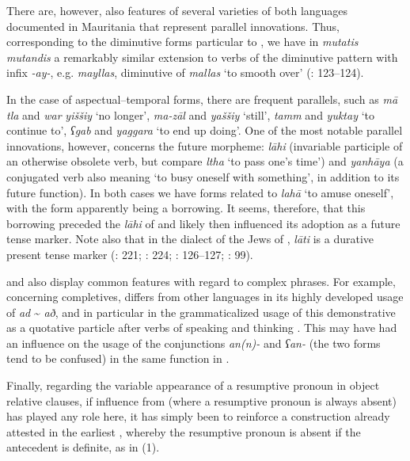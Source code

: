 \documentclass[output=paper]{langsci/langscibook}
\begin{document}
There are, however, also features of several varieties of both languages documented in Mauritania that represent parallel innovations. Thus, corresponding to the {diminutive} forms particular to , we have in  \textit{mutatis} \textit{mutandis} a remarkably similar {extension} to verbs of the {diminutive} pattern with infix \textit{-ay-}, e.g. \textit{mayllas}, {diminutive} of \textit{mallas} ‘to smooth over’ (\citealt{Taine-Cheikh2008chapter}: 123–124).

In the case of aspectual--temporal forms, there are frequent parallels, such as  \textit{mā} \textit{tla} and  \textit{war} \textit{yiššiy} ‘no longer’,  \textit{ma-zāl} and  \textit{yaššiy} ‘still’,  \textit{tamm} and  \textit{yuktay} ‘to continue to’,  \textit{ʕgab} and  \textit{yaggara} ‘to end up doing’. One of the most notable parallel innovations, however, concerns the {future} morpheme:  \textit{lāhi} (invariable {participle} of an otherwise obsolete verb, but compare \textit{ltha} ‘to pass one’s time’) and  \textit{yanhāya} (a conjugated verb also meaning ‘to busy oneself with something’, in addition to its {future} function). In both cases we have forms related to   \textit{lahā} ‘to amuse oneself’, with the  form apparently being a borrowing. It seems, therefore, that this borrowing preceded the \textit{lāhi} of  and likely then influenced its adoption as a {future} {tense} marker. Note also that in the  dialect of the {Jews} of , \textit{lāti} is a durative present {tense} marker (\citealt{Cohen1924}: 221; \citealt{Taine-Cheikh2004}: 224; \citealt{Taine-Cheikh2008chapter}: 126–127; \citealt{Taine-Cheikh2009}: 99).

 and  also display common features with regard to complex phrases. For example, concerning completives,  differs from other  languages in its highly developed usage of \textit{ad} \~{} \textit{að}, and in particular in the grammaticalized usage of this demonstrative as a quotative particle after verbs of speaking and thinking \citep{Taine-Cheikh2010Zenaga}. This may have had an influence on the usage of the conjunctions \textit{an(n)-} and \textit{ʕan-} (the two forms tend to be confused) in the same function in .

Finally, regarding the variable appearance of a resumptive pronoun in  object {relative} clauses, if influence from  (where a resumptive pronoun is always absent) has played any role here, it has simply been to reinforce a construction already attested in the earliest , whereby the resumptive pronoun is absent if the antecedent is {definite}, as in ‎(1).
\end{document}
